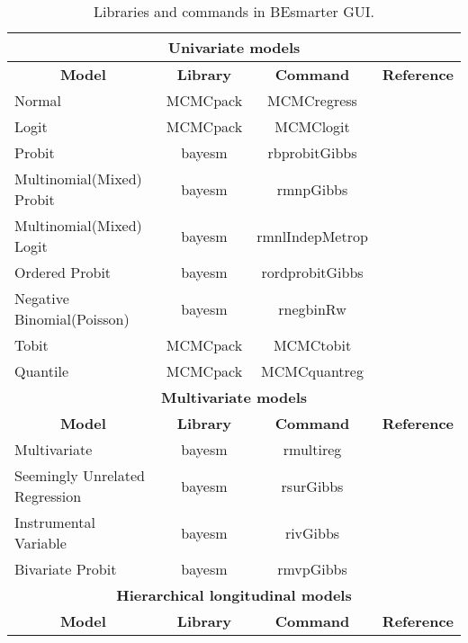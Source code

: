 \begin{table}[!ht]
	\begin{center}
	\caption{Libraries and commands in BEsmarter GUI.} \label{tab:libraries}
	{{
	\begin{tabular}{|l|c|c|c|}
	\hline 
	\multicolumn{4}{|c|}{\textbf{Univariate models}} \\
	\hline  
	 \multicolumn{1}{|c|}{\textbf{Model}} & \multicolumn{1}{c}{\textbf{Library}} & \multicolumn{1}{|c|}{\textbf{Command}} &
	 \multicolumn{1}{|c|}{\textbf{Reference}} \\ 
	 \hline 
	Normal & MCMCpack & MCMCregress & \cite{Martin2018}\\
	Logit & MCMCpack & MCMClogit & \cite{Martin2018} \\
	Probit & bayesm & rbprobitGibbs & \cite{Rossi2017} \\
	Multinomial(Mixed) Probit  & bayesm & rmnpGibbs & \cite{Rossi2017} \\
	Multinomial(Mixed) Logit  & bayesm  & rmnlIndepMetrop & \cite{Rossi2017} \\
	Ordered Probit  & bayesm  & rordprobitGibbs & \cite{Rossi2017} \\
	Negative Binomial(Poisson)   & bayesm & rnegbinRw & \cite{Rossi2017} \\
	Tobit   & MCMCpack & MCMCtobit & \cite{Martin2018} \\
	Quantile   & MCMCpack & MCMCquantreg & \cite{Martin2018} \\
	\hline 
	\multicolumn{4}{|c|}{\textbf{Multivariate models}} \\
	\hline  
	\multicolumn{1}{|c|}{\textbf{Model}} & \multicolumn{1}{c}{\textbf{Library}} & \multicolumn{1}{|c|}{\textbf{Command}} &\multicolumn{1}{|c|}{\textbf{Reference}} \\ 
	\hline
	Multivariate   & bayesm & rmultireg & \cite{Rossi2017} \\
	Seemingly Unrelated Regression & bayesm & rsurGibbs & \cite{Rossi2017} \\
	Instrumental Variable  & bayesm & rivGibbs & \cite{Rossi2017} \\
	Bivariate Probit   & bayesm & rmvpGibbs & \cite{Rossi2017} \\
	\hline
	\multicolumn{4}{|c|}{\textbf{Hierarchical longitudinal models}} \\
	\hline  
	\multicolumn{1}{|c|}{\textbf{Model}} & \multicolumn{1}{c}{\textbf{Library}} & \multicolumn{1}{|c|}{\textbf{Command}} & \multicolumn{1}{|c|}{\textbf{Reference}} \\ 
	\hline

\end{tabular}}}
\end{center}
\end{table}
